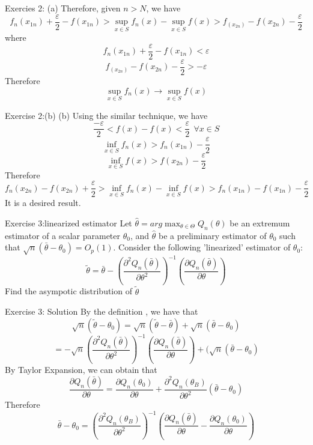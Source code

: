 \documentclass{beamer}
\begin{document}
\begin{frame}{Exercies 2: (a)}
	Therefore, given $n>N$, we have
	\[ f_n(x_{1n}) + \frac{\varepsilon}{2} - f(x_{1n})> \sup_{x \in S} f_n(x) - \sup_{x \in S} f(x) > f_(x_{2n}) - f(x_{2n}) - \frac{\varepsilon}{2}\]
	where
	\[f_n(x_{1n}) + \frac{\varepsilon}{2} - f(x_{1n}) < \varepsilon\]
	\[f_(x_{2n}) - f(x_{2n}) - \frac{\varepsilon}{2} > - \varepsilon\]
	Therefore
	\[\sup_{x \in S} f_n(x) \rightarrow \sup_{x \in S} f(x)\]
\end{frame}
\begin{frame}{Exercise 2:(b)}     
	(b) Using the similar technique, we have 
	\[\frac{-\varepsilon}{2}< f(x) - f(x) < \frac{\varepsilon}{2} \ \ \forall x \in S\]
	\[\inf_{x \in S} f_n(x) > f_n(x_{1n}) - \frac{\varepsilon}{2}\]
	\[\inf_{x \in S} f(x) > f(x_{2n}) - \frac{\varepsilon}{2}\]
	Therefore
	\[f_n(x_{2n}) - f(x_{2n}) + \frac{\varepsilon}{2} > \inf_{x \in S} f_n(x) - \inf_{x \in S} f(x) > f_n(x_{1n}) - f(x_{1n}) - \frac{\varepsilon}{2}\]
	It is a desired result.
\end{frame}
\begin{frame}{Exercise 3:linearized  estimator}
	Let $\hat{\theta} = arg\max_{\theta \in \Theta} Q_n(\theta)$ be an extremum estimator of a scalar parameter $\theta_0$, and $\hat{\theta}$ be a preliminary estimator of $\theta_0$ such that $\sqrt{n}(\bar{\theta}-\theta_0) = O_p(1)$. Consider the following 'linearized' estimator of $\theta_0$:
	\[\tilde{\theta} = \bar{\theta} - (\frac{\partial^2 Q_n(\bar{\theta})}{\partial \theta^2})^{-1} (\frac{\partial Q_n(\bar{\theta})}{\partial \theta}) \]
	Find the asympotic distribution of $\tilde{\theta}$ 
\end{frame}
\begin{frame}{Exercise 3: Solution}
	By the definition , we have that 
	\[\sqrt{n}(\tilde{\theta} - \theta_0) = \sqrt{n}(\tilde{\theta} - \bar{\theta}) + \sqrt{n}(\bar{\theta} - \theta_0)\]
	\[ = -\sqrt{n}(\frac{\partial^2 Q_n(\bar{\theta})}{\partial \theta^2})^{-1} (\frac{\partial Q_n(\bar{\theta})}{\partial \theta}) + (\sqrt{n}(\bar{\theta} - \theta_0)\]
		By Taylor Expansion, we can obtain that 
		\[\frac{\partial Q_n(\bar{\theta})}{\partial \theta}  = \frac{\partial Q_n(\theta_0)}{\partial \theta} + \frac{\partial^2 Q_n(\theta_B)}{\partial \theta^2}(\bar{\theta} - \theta_0)\]
		Therefore
		\[\bar{\theta} - \theta_0 = (\frac{\partial^2 Q_n(\theta_B)}{\partial \theta^2})^{-1} (\frac{\partial Q_n(\bar{\theta})}{\partial \theta}  -  \frac{\partial Q_n(\theta_0)}{\partial \theta})\]
\end{frame}
\end{document}
